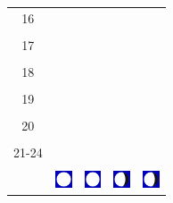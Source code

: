 \documentclass[twoside, a4paper,12pt, tikz]{scrartcl}
\begin{document}
\begin{tabularx}{\linewidth}{|c|X|X|p{2cm}|p{2cm}|}
            &   &       &    &   \\
          \hline
          16&   &                 &    &   \\
            &   &       &    &   \\
          \hline
          17&   &                 &    &   \\
            &   &       &    &   \\
          \hline
          18&   &                 &    &   \\
            &   &       &    &   \\
          \hline
          19&   &                 &     &   \\
            &   &       &    &   \\
          \hline
          20&   &              &    &   \\
            &   &       &    &   \\
          \hline 
          21-24&   &              &    &   \\
            &   &       &    &   \\
          \hline
                      & \vspace{0.01cm} \centerline{\includegraphics[width=0.5cm]{moon_phases/Moon_phase_4.svg.png}} \vspace{0.1cm} & \vspace{0.01cm} \centerline{\includegraphics[width=0.5cm]{moon_phases/Moon_phase_4.svg.png}} \vspace{0.1cm} & \vspace{0.01cm} \centerline{\includegraphics[width=0.5cm]{moon_phases/Moon_phase_5.svg.png}} \vspace{0.1cm} & \vspace{0.01cm} \centerline{\includegraphics[width=0.5cm]{moon_phases/Moon_phase_5.svg.png}} \vspace{0.1cm}\\
          \hline    
        \end{tabularx}
\end{document}
